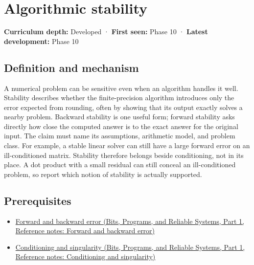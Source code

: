 \hypertarget{appendix-aa2bf0d79639}{}\label{referencestart:appendix-aa2bf0d79639}
\section{Algorithmic stability}\label{appendix-aa2bf0d79639-algorithmic-stability}

\hypertarget{appendix-aa2bf0d79639-algorithmic-stability}{}

\textbf{Curriculum depth:} Developed · \textbf{First seen:} Phase 10 · \textbf{Latest development:} Phase 10

\begin{allmightroledefinition}

\subsection{Definition and mechanism}\label{appendix-aa2bf0d79639-definition-and-mechanism}

\hypertarget{appendix-aa2bf0d79639-definition-and-mechanism}{}

A numerical problem can be sensitive even when an algorithm handles it well. Stability describes whether the finite-precision algorithm introduces only the error expected from rounding, often by showing that its output exactly solves a nearby problem. Backward stability is one useful form; forward stability asks directly how close the computed answer is to the exact answer for the original input. The claim must name its assumptions, arithmetic model, and problem class. For example, a stable linear solver can still have a large forward error on an ill-conditioned matrix. Stability therefore belongs beside conditioning, not in its place. A dot product with a small residual can still conceal an ill-conditioned problem, so report which notion of stability is actually supported.

\end{allmightroledefinition}

\subsection{Prerequisites}\label{appendix-aa2bf0d79639-prerequisites}

\hypertarget{appendix-aa2bf0d79639-prerequisites}{}

\begin{itemize}
\tightlist
\item
  \href{../01-Bits-Programs-and-Reliable-Systems-P01/main.pdf\#appendix-a7fbaf6d1b1c}{Forward and backward error (Bits, Programs, and Reliable Systems, Part 1, Reference notes: Forward and backward error)}
\item
  \href{../01-Bits-Programs-and-Reliable-Systems-P01/main.pdf\#appendix-8f6a01f284a7}{Conditioning and singularity (Bits, Programs, and Reliable Systems, Part 1, Reference notes: Conditioning and singularity)}
\end{itemize}

